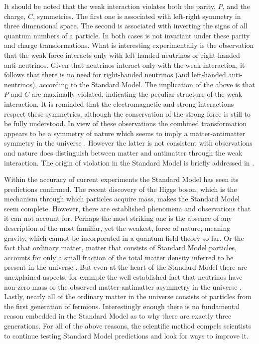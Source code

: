It should be noted that the weak interaction violates both the parity, $P$, and the charge, $C$, symmetries.
The first one is associated with left-right symmetry in three dimensional space.
The second is associated with inverting the signs of all quantum numbers of a particle.
In both cases  is not invariant under these parity and charge transformations.
What is interesting experimentally is the observation \cite{wu-parity,garwin-parity} that the weak force interacts
only with left handed neutrinos or right-handed anti-neutrinos. Given that neutrinos interact only with the weak interaction,
it follows that there is no need for right-handed neutrinos (and left-handed anti-neutrinos), according to the Standard Model.
The implication of the above is that $P$ and $C$ are maximally violated, indicating the
peculiar structure of the weak interaction. It is reminded that the electromagnetic and
strong interactions respect these symmetries, although the \CP conservation of the strong force is still to be fully understood.
In view of these observations the combined \CP transformation appears to be
a symmetry of nature which seems to imply a matter-antimatter symmetry in the universe \cite{Sakharov:1967dj}.
However the latter is not consistent with observations and nature does distinguish between matter and antimatter
through the weak interaction. The origin of \CP violation in the Standard Model is briefly addressed in .

Within the accuracy of current experiments the Standard Model has seen its predictions confirmed.
The recent discovery of the Higgs boson, which is the mechanism through which particles acquire mass, makes the
Standard Model seem complete. However, there are established phenomena and observations that it can not
account for. Perhaps the most striking one is the absence of any description of the most familiar, yet the weakest,
force of nature, meaning gravity, which cannot be incorporated in a quantum field theory so far.
Or the fact that ordinary matter, \ie matter that consists of Standard Model particles, accounts for only a small
fraction of the total matter density inferred to be present in the universe \cite{dmatter-Hinshaw}. But even at the heart
of the Standard Model there are unexplained aspects, for example the well established fact that neutrinos have non-zero
mass \cite{nu-mass-superkam,nu-mass-kamland,nu-mass-sno,nu-mass-daya} or the observed
matter-antimatter asymmetry in the universe \cite{more-cpv-huet,more-cpv-gavela_I,more-cpv-gavela_II}.
Lastly, nearly all of the ordinary matter in the universe consists of
particles from the first generation of fermions. Interestingly enough there is no fundamental reason embedded in the Standard Model
as to why there are exactly three generations. For all of the above reasons, the scientific method compels scientists to continue
testing Standard Model predictions and look for ways to improve it.
